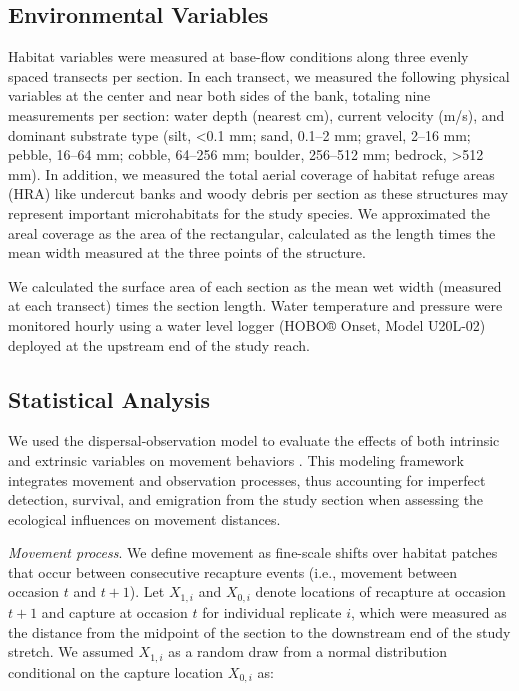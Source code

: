 \documentclass[11pt, class=article, crop=false]{standalone}
\begin{document}
\subsection{Environmental Variables}

Habitat variables were measured at base-flow conditions along three evenly spaced transects per section. In each transect, we measured the following physical variables at the center and near both sides of the bank, totaling nine measurements per section: water depth (nearest cm), current velocity (m/s), and dominant substrate type (silt, <0.1 mm; sand, 0.1--2 mm; gravel, 2--16 mm; pebble, 16--64 mm; cobble, 64--256 mm; boulder, 256--512 mm; bedrock, >512 mm). In addition, we measured the total aerial coverage of habitat refuge areas (HRA) like undercut banks and woody debris per section as these structures may represent important microhabitats for the study species. We approximated the areal coverage as the area of the rectangular, calculated as the length times the mean width measured at the three points of the structure.

We calculated the surface area of each section as the mean wet width (measured at each transect) times the section length. Water temperature and pressure were monitored hourly using a water level logger (HOBO® Onset, Model U20L-02) deployed at the upstream end of the study reach.

\subsection{Statistical Analysis}

We used the dispersal-observation model to evaluate the effects of both intrinsic and extrinsic variables on movement behaviors \citep{teruiModelingDispersalUsing2020}. This modeling framework integrates movement and observation processes, thus accounting for imperfect detection, survival, and emigration from the study section when assessing the ecological influences on movement distances.

\textit{Movement process}. We define movement as fine-scale shifts over habitat patches that occur between consecutive recapture events (i.e., movement between occasion $t$ and $t+1$). Let $X_{1,i}$ and $X_{0,i}$ denote locations of recapture at occasion $t+1$ and capture at occasion $t$ for individual replicate $i$, which were measured as the distance from the midpoint of the section to the downstream end of the study stretch. We assumed $X_{1,i}$ as a random draw from a normal distribution conditional on the capture location $X_{0,i}$ as:    
\end{document}
